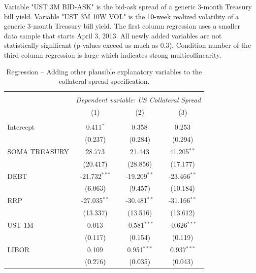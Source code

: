 \documentclass[11pt,a4paper,english,oneside]{article}
\begin{document}
\begin{appendices}

\begin{table}[!htbp] \centering
\caption{Regression -- Adding other plausible explanatory variables to the collateral spread specification.}
\vspace{-10pt}
\begin{flushleft}
Variable "UST 3M BID-ASK" is the bid-ask spread of a generic 3-month Treasury bill yield. Variable "UST 3M 10W VOL" is the 10-week realized volatility of a generic 3-month Treasury bill yield. The first column regression uses a smaller data sample that starts April 3, 2013. All newly added variables are not statistically significant (p-values exceed as much as 0.3). Condition number of the third column regression is large which indicates strong multicollinearity.
\end{flushleft}
\begin{tabular}{@{\extracolsep{5pt}}lccc}
\\[-1.8ex]\hline
\hline \\[-1.8ex]
& \multicolumn{3}{c}{\textit{Dependent variable: US Collateral Spread}} \
\cr \cline{3-4}
\\[-1.8ex] & (1) & (2) & (3) \\
\hline \\[-1.8ex]
 Intercept & 0.411$^{*}$ & 0.358$^{}$ & 0.253$^{}$ \\
  & (0.237) & (0.284) & (0.294) \\
 SOMA TREASURY & 28.773$^{}$ & 21.443$^{}$ & 41.205$^{**}$ \\
  & (20.417) & (28.856) & (17.177) \\
 DEBT & -21.732$^{***}$ & -19.209$^{**}$ & -23.466$^{**}$ \\
  & (6.063) & (9.457) & (10.184) \\
 RRP & -27.035$^{**}$ & -30.481$^{**}$ & -31.166$^{**}$ \\
  & (13.337) & (13.516) & (13.612) \\
 UST 1M & 0.013$^{}$ & -0.581$^{***}$ & -0.626$^{***}$ \\
  & (0.117) & (0.154) & (0.119) \\
 LIBOR & 0.109$^{}$ & 0.951$^{***}$ & 0.937$^{***}$ \\
  & (0.276) & (0.035) & (0.043) \\

\end{tabular}
\end{table}
\end{appendices}
\end{document}
